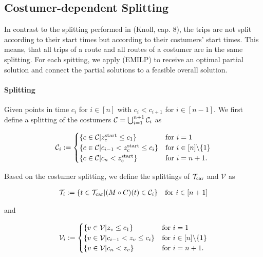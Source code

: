 \subsection{Costumer-dependent Splitting}

In contrast to the splitting performed in (Knoll, cap. 8), the trips are not split according to their start times but according to their costumers' start times. This means, that all trips of a route and all routes of a costumer are in the same splitting. For each spitting, we apply (EMILP) to receive an optimal partial solution and connect the partial solutions to a feasible overall solution.

\paragraph{Splitting} \parfill

Given points in time $c_i$ for $i\in[n]$ with $c_i<c_{i+1}$ for $i\in[n-1]$. We first define a splitting of the costumers $\mathcal{C}=\bigcup_{i=1}^{n+1}\mathcal{C}_i$ as

\begin{align*}
	\mathcal{C}_i := \begin{cases}
		\left\{c\in\mathcal{C}|z^{\operatorname{start}}_c\leq c_1\right\} & \text{for } i=1 \\
		\left\{c\in\mathcal{C}|c_{i-1}<z^{\operatorname{start}}_c\leq c_i\right\} & \text{for } i\in[n]\backslash\{1\} \\
		\left\{c\in\mathcal{C}|c_n<z^{\operatorname{start}}_c\right\} & \text{for } i=n+1.
	\end{cases}
\end{align*}

Based on the costumer splitting, we define the splittings of $\mathcal{T}_{\operatorname{car}}$ and $\mathcal{V}$ as

\begin{align*}
	\mathcal{T}_i := \left\{t\in\mathcal{T}_{\operatorname{car}}|(M\circ C)(t)\in\mathcal{C}_i\right\} && \text{for } i\in[n+1]
\end{align*}

and

\begin{align*}
	\mathcal{V}_i := \begin{cases}
		\left\{v\in\mathcal{V}|z_v\leq c_1\right\} & \text{for } i=1 \\
		\left\{v\in\mathcal{V}|c_{i-1}<z_v\leq c_i\right\} & \text{for } i\in[n]\backslash\{1\} \\
		\left\{v\in\mathcal{V}|c_n<z_v\right\} & \text{for } i=n+1.
	\end{cases}
\end{align*}

